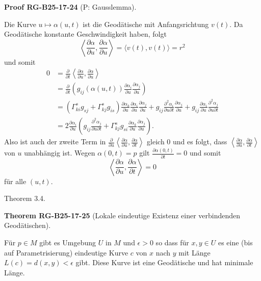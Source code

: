 \documentclass[10pt, letterpaper]{article}
\newcommand{\CustomHeading}[3]{%
  \par\medskip\noindent%
  \textbf{#1 #2} \textnormal{(#3)}.\enskip%
}
\newenvironment{THEO}[2]{\begin{unitbox}\CustomHeading{Theorem}{#1}{#2}}{\end{unitbox}}
\newenvironment{PROOF}[2]{\begin{unitbox}\CustomHeading{Proof}{#1}{#2}}{\end{unitbox}}
\begin{document}
\begin{PROOF}{RG-B25-17-24}{P: Gausslemma}
Die Kurve $u \mapsto \alpha(u, t)$ ist die Geodätische mit Anfangsrichtung $v(t)$. Da Geodätische konstante Geschwindigkeit haben, folgt
$$
\left\langle\frac{\partial \alpha}{\partial u}, \frac{\partial \alpha}{\partial u}\right\rangle=\langle v(t), v(t)\rangle=r^{2}
$$
und somit
$$
\begin{aligned}
0 & =\frac{\partial}{\partial t}\left\langle\frac{\partial \alpha}{\partial u}, \frac{\partial \alpha}{\partial u}\right\rangle \\
& =\frac{\partial}{\partial t}\left(g_{i j}(\alpha(u, t)) \frac{\partial \alpha_{i}}{\partial u} \frac{\partial \alpha_{j}}{\partial u}\right) \\
& =\left(\Gamma_{k i}^{s} g_{s j}+\Gamma_{k j}^{s} g_{i s}\right) \frac{\partial \alpha_{k}}{\partial u} \frac{\partial \alpha_{i}}{\partial u} \frac{\partial \alpha_{j}}{\partial u}+g_{i j} \frac{\partial^{2} \alpha_{i}}{\partial u \partial t} \frac{\partial \alpha_{j}}{\partial u}+g_{i j} \frac{\partial \alpha_{i}}{\partial u} \frac{\partial^{2} \alpha_{j}}{\partial u \partial t} \\
& =2 \frac{\partial \alpha_{i}}{\partial u}\left(g_{i j} \frac{\partial^{2} \alpha_{j}}{\partial u \partial t}+\Gamma_{k j}^{s} g_{s i} \frac{\partial \alpha_{k}}{\partial u} \frac{\partial \alpha_{j}}{\partial u}\right) .
\end{aligned}
$$
Also ist auch der zweite Term in $\frac{\partial}{\partial u}\left\langle\frac{\partial \alpha}{\partial u}, \frac{\partial \alpha}{\partial t}\right\rangle$ gleich 0 und es folgt, dass $\left\langle\frac{\partial \alpha}{\partial u}, \frac{\partial \alpha}{\partial t}\right\rangle$ von $u$ unabhängig ist. Wegen $\alpha(0, t)=p$ gilt $\frac{\partial \alpha(0, t)}{\partial t}=0$ und somit
$$
\left\langle\frac{\partial \alpha}{\partial u}, \frac{\partial \alpha}{\partial t}\right\rangle=0
$$
für alle $(u, t)$.
\end{PROOF}




Theorem 3.4. 


\begin{THEO}{RG-B25-17-25}{Lokale eindeutige Existenz einer verbindenden Geodätischen}
Für $p \in M$ gibt es Umgebung $U$ in $M$ und $\epsilon>0$ so dass für $x, y \in U$ es eine (bis auf Parametrisierung) eindeutige Kurve $c$ von $x$ nach $y$ mit Länge $L(c)=d(x, y)<\epsilon$ gibt. Diese Kurve ist eine Geodätische und hat minimale Länge.
\end{THEO}
\end{document}
